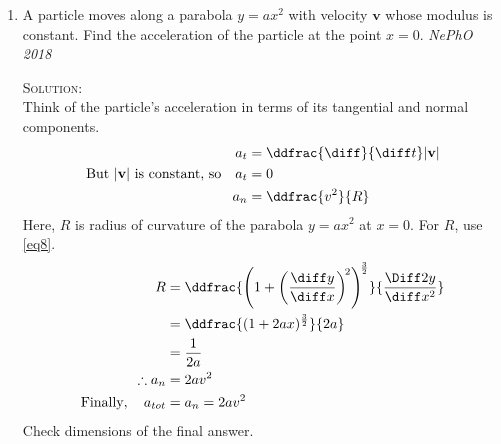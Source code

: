 \begin{enumerate}
\begin{figure}[hbt]
    \centering
    
\end{figure}

Relative velocities can be written in vectorical form as shown below.
\begin{align*}
    \mathbf{v}_{P/W}&=\mathbf{v}_{P/G}+\mathbf{v}_{G/W}\\
    \mathbf{v}_{P/W}&=\mathbf{v}_{P/G}+(-\mathbf{v}_{W/G})
\end{align*}

So the direction of $\mathbf{v}_{P/W}$ or the direction pilot should head for is shown in the vector diagram below\\

\begin{figure}[hbt]
    \centering
    
\end{figure}

Using Pythagorean theorem in the right triangle
\begin{align*}
{v_{P/W}}^2&={v_{P/G}}^2+{v_{W/G}}^2\\
v_{P/G}&=\sqrt{{v_{P/W}}^2-{v_{W/G}}^2}\\
\text{And} \quad \sin\theta &= \ddfrac{v_{W/G}}{v_{P/W}}\\
\theta &= \sin^{-1}\biggl(\ddfrac{v_{W/G}}{v_{P/W}}\biggr)
\end{align*}
Use $v_{W/G}$=80.0 km/h and $v_{P/W}$=320.0 km/h,
\begin{equation*}
v_{P/G}=309.8 \si{km/h} \quad \text{and} \quad \theta=14.5\degree
\end{equation*}
The pilot should head 14.5\degree  north of west and the speed of plane over the ground is 309.8 km/h.

\item A particle moves along a parabola $y=ax^2$ with velocity $\mathbf{v}$ whose modulus is constant. Find the acceleration of the particle at the point $x=0$. \hfill \textsl{NePhO 2018}

\textsc{Solution:}\\
Think of the particle's acceleration in terms of its tangential and normal components.
\begin{align*}
a_t&=\ddfrac{\diff}{\diff t}|\mathbf{v}|\\
\text{But $|\mathbf{v}|$ is constant, so} \quad a_t&=0\\
a_n&=\ddfrac{v^2}{R}
\end{align*}
Here, $R$ is radius of curvature of the parabola $y=ax^2$ at $x=0$. For $R$, use \eqref{eq8}.
\begin{align*}
R&=\ddfrac{\left(1+\left(\frac{\diff y}{\diff x}\right)^{\!2}\right)^{\!\frac{3}{2}}}{\frac{\Diff2 y}{\diff x^2}}\\
&=\ddfrac{(1+2ax)^{\frac{3}{2}}}{2a}\\
&=\frac{1}{2a}\\
\therefore a_n&= 2av^2\\
\text{Finally}, \quad a_{tot}&=a_n=2av^2
\end{align*}
Check dimensions of the final answer.


\end{enumerate}
